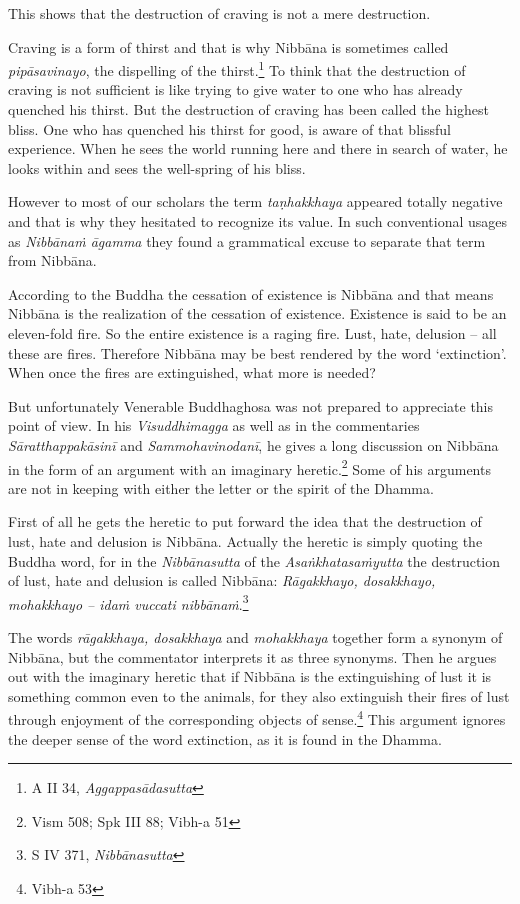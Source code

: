 This shows that the destruction of craving is not a mere destruction.

Craving is a form of thirst and that is why Nibbāna is sometimes called \emph{pipāsavinayo}, the dispelling of the thirst.\footnote{A II 34, \emph{Aggappasādasutta}} To think that the destruction of craving is not sufficient is like trying to give water to one who has already quenched his thirst. But the destruction of craving has been called the highest bliss. One who has quenched his thirst for good, is aware of that blissful experience. When he sees the world running here and there in search of water, he looks within and sees the well-spring of his bliss.

However to most of our scholars the term \emph{taṇhakkhaya} appeared totally negative and that is why they hesitated to recognize its value. In such conventional usages as \emph{Nibbānaṁ āgamma} they found a grammatical excuse to separate that term from Nibbāna.

According to the Buddha the cessation of existence is Nibbāna and that means Nibbāna is the realization of the cessation of existence. Existence is said to be an eleven-fold fire. So the entire existence is a raging fire. Lust, hate, delusion -- all these are fires. Therefore Nibbāna may be best rendered by the word `extinction'. When once the fires are extinguished, what more is needed?

But unfortunately Venerable Buddhaghosa was not prepared to appreciate this point of view. In his \emph{Visuddhimagga} as well as in the commentaries \emph{Sāratthappakāsinī} and \emph{Sammohavinodanī}, he gives a long discussion on Nibbāna in the form of an argument with an imaginary heretic.\footnote{Vism 508; Spk III 88; Vibh-a 51} Some of his arguments are not in keeping with either the letter or the spirit of the Dhamma.

First of all he gets the heretic to put forward the idea that the destruction of lust, hate and delusion is Nibbāna. Actually the heretic is simply quoting the Buddha word, for in the \emph{Nibbānasutta} of the \emph{Asaṅkhatasaṁyutta} the destruction of lust, hate and delusion is called Nibbāna: \emph{Rāgakkhayo, dosakkhayo, mohakkhayo -- idaṁ vuccati nibbānaṁ}.\footnote{S IV 371, \emph{Nibbānasutta}}

The words \emph{rāgakkhaya, dosakkhaya} and \emph{mohakkhaya} together form a synonym of Nibbāna, but the commentator interprets it as three synonyms. Then he argues out with the imaginary heretic that if Nibbāna is the extinguishing of lust it is something common even to the animals, for they also extinguish their fires of lust through enjoyment of the corresponding objects of sense.\footnote{Vibh-a 53} This argument ignores the deeper sense of the word extinction, as it is found in the Dhamma.

